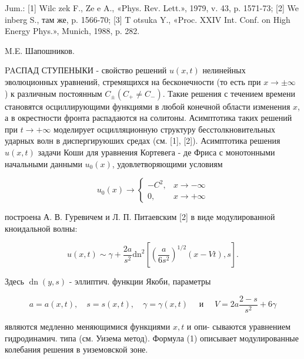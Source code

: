 \documentclass[10pt]{article}
\begin{document}
Jum.: [1] Wilc zek F., Ze e A., «Phys. Rev. Lett.», 1979, v. 43, p. 1571-73; [2] We inberg S., там же, p. 1566-70; [3] T otsuka Y., «Proc. XXIV Int. Conf. on High Energy Phys.», Munich, 1988, p. 282.



M.E. Шапошников.



PAСПАД СТУПЕНЫКИ - свойство решений $u(x, t)$ нелинейных эволюционных уравнений, стремящихся на бесконечности (то есть при $x \rightarrow \pm \infty$ ) к различным постоянным $C_{ \pm}\left(C_{+} \neq C_{-}\right)$. Такие решения с течением времени становятся осциллирующими функциями в любой конечной области изменения $x$, а в окрестности фронта распадаются на солитоны. Асимптотика таких решений при $t \rightarrow+\infty$ моделирует осцилляционную структуру бесстолкновительных ударных волн в диспергируюших средах (см. [1], [2]). Асимптотика решения $u(x, t)$ задачи Коши для уравнения Кортевега - де Фриса с монотонными начальными данными $u_{0}(x)$, удовлетворяющими условиям



\[

u_{0}(x) \rightarrow\left\{\begin{array}{cc}

-C^{2}, & x \rightarrow-\infty \\

0, & x \rightarrow+\infty

\end{array}\right.

\]



построена А. В. Гуревичем и Л. П. Питаевским [2] в виде модулированной кноидальной волны:



\[

u(x, t) \sim \gamma+\frac{2 a}{s^{2}} \mathrm{dn}^{2}\left[\left(\frac{a}{6 s^{2}}\right)^{1 / 2}(x-V t), s\right] .

\]



Здесь $\operatorname{dn}(y, s)$ - эллиптич. функции Якоби, параметры



\[

a=a(x, t), \quad s=s(x, t), \quad \gamma=\gamma(x, t) \quad \text { и } \quad V=2 a \frac{2-s}{s^{2}}+6 \gamma

\]



являются медленно меняющимися функциями $x, t$ и опи- сываются уравнением гидродинамич. типа (см. Уизема метод). Формула (1) описывает модулированные колебания решения в уиземовской зоне.
\end{document}
